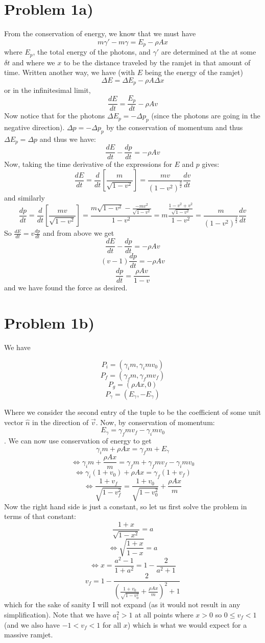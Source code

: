 
\section*{Problem 1a)}
From the conservation of energy, we know that we must have 
\[ m\gamma' - m\gamma = E_p - \rho Ax  \]
where $E_p$, the total energy of the photons, and $\gamma'$ are determined at the at some $\delta t$ and where we $x$ to be the distance traveled by the ramjet in that amount of time. Written another way, we have (with $E$ being the energy of the ramjet)
\[ \Delta E =  \Delta E_p - \rho A \Delta x \]
or in the infinitesimal limit,
\[\frac{dE}{dt}= \frac{E_p}{dt} - \rho A v \]
Now notice that for the photons $\Delta E_p=-\Delta p_p$ (since the photons are going in the negative direction). $\Delta p=-\Delta p_p$ by the conservation of momentum and thus $\Delta E_p=\Delta p$ and thus we have:
\[ \frac{dE}{dt}-\frac{dp}{dt}=-\rho A v \]
Now, taking the time derivative of the expressions for $E$ and $p$ gives:
\[ \frac{dE}{dt} = \frac{d}{dt}\left[\frac{m}{\sqrt{1-v^2}}\right] = \frac{mv}{(1-v^2)^{\frac{3}{2}}} \frac{dv}{dt} \]
and similarly
\[ \frac{dp}{dt} = \frac{d}{dt}\left[\frac{mv}{\sqrt{1-v^2}}\right] = 
\frac{m\sqrt{1-v^2}-\frac{-mv^2}{\sqrt{1-v^2}}}{1-v^2} = 
m\dfrac{\frac{1-v^2+v^2}{\sqrt{1-v^2}}}{1-v^2} = \frac{m}{(1-v^2)^{\frac{3}{2}}}  \frac{dv}{dt} \]
So $\frac{dE}{dt} = v \frac{dp}{dt}$ and from above we get
\[ \frac{dE}{dt}-\frac{dp}{dt}=-\rho A v \]
\[ (v-1)\frac{dp}{dt}=-\rho A v \]
\[ \frac{dp}{dt} = \frac{\rho A v}{1-v} \]
and we have found the force as desired. 
\section*{Problem 1b)}
We have 
\begin{multicols}{4}
\noindent
\[ P_i = (\gamma_i m, \gamma_i m v_0) \]
\[ P_f = (\gamma_f m, \gamma_f m v_f) \]
\[ P_g = (\rho A x, 0) \]
\[ P_\gamma = (E_\gamma, -E_\gamma) \]
\end{multicols}
Where we consider the second entry of the tuple to be the coefficient of some unit vector $\hat{n}$ in the direction of $\vec{v}$.
Now, by conservation of momentum:
\[  E_\gamma = \gamma_f m v_f - \gamma_i m v_0 \].
We can now use conservation of energy to get
\[ \gamma_i m + \rho A x= \gamma_f m + E_\gamma \]
\[ \iff \gamma_i m +  \frac{\rho A x}{m} = \gamma_f m + \gamma_f m v_f - \gamma_i m v_0 \]
\[ \iff \gamma_i (1+v_0) + \rho A x = \gamma_f (1 + v_f) \]
\[ \iff \frac{1+v_f}{\sqrt{1-v_f^2}}=\frac{1+v_0}{\sqrt{1-v_0^2}}+ \frac{\rho A x}{m}  \]
Now the right hand side is just a constant, so let us first solve the problem in terms of that constant:
\[ \frac{1+x}{\sqrt{1-x^2}}=a \]
\[ \iff \sqrt{\frac{1+x}{1-x}}=a \]
\[ \iff x = \frac{a^2-1}{1+a^2} = 1-\frac{2}{a^2+1} \]
\[ \boxed{ v_f = 1-\dfrac{2}{\left(\frac{1+v_0}{\sqrt{1-v_0^2}}+ \frac{\rho A x}{m} \right)^2+1} } \]
which for the sake of sanity I will not expand (as it would not result in any simplification). Note that we have $a^2_1>1$ at all points where $x>0$ so $0\leq v_f < 1$ (and we also have $-1 < v_f < 1$ for all $x$) which is what we would expect for a massive ramjet.
